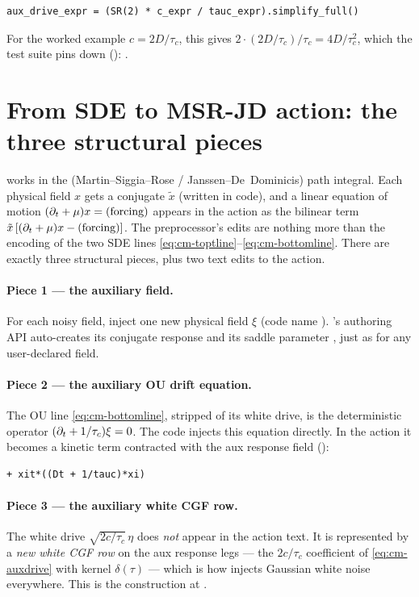 \begin{lstlisting}
aux_drive_expr = (SR(2) * c_expr / tauc_expr).simplify_full()
\end{lstlisting}

For the worked example $c = 2D/\tau_c$, this gives
$2\cdot(2D/\tau_c)/\tau_c = 4D/\tau_c^2$, which the test suite pins down
():
.

\section{From SDE to MSR-JD action: the three structural pieces}

\Daedalus{} works in the \msrjd{} (Martin--Siggia--Rose / Janssen--De~Dominicis)
path integral. Each physical field $x$ gets a conjugate 
$\tilde x$ (written  in code), and a linear equation of motion
$(\partial_t + \mu)x = (\text{forcing})$ appears in the action as the bilinear term
$\tilde x\,[(\partial_t + \mu)x - (\text{forcing})]$. The preprocessor's edits are
nothing more than the \msrjd{} encoding of the two SDE lines
\eqref{eq:cm-toptline}--\eqref{eq:cm-bottomline}. There are exactly three
structural pieces, plus two text edits to the action.

\paragraph{Piece 1 --- the auxiliary field.} For each noisy field, inject one new
physical field $\xi$ (code name ). \Daedalus's authoring API auto-creates
its conjugate response  and its saddle parameter , just as
for any user-declared field.

\paragraph{Piece 2 --- the auxiliary OU drift equation.} The OU line
\eqref{eq:cm-bottomline}, stripped of its white drive, is the deterministic
operator $(\partial_t + 1/\tau_c)\xi = 0$. The code injects this equation directly. In
the action it becomes a kinetic term contracted with the aux response field
 ():
\begin{lstlisting}[style=console]
    + xit*((Dt + 1/tauc)*xi)
\end{lstlisting}

\paragraph{Piece 3 --- the auxiliary white CGF row.} The white drive
$\sqrt{2c/\tau_c}\,\eta$ does \emph{not} appear in the action text. It is
represented by a \emph{new white CGF row} on the aux response legs --- the
$2c/\tau_c$ coefficient of \eqref{eq:cm-auxdrive} with kernel $\delta(\tau)$ ---
which is how \Daedalus{} injects Gaussian white noise everywhere. This is the
 construction at
.

